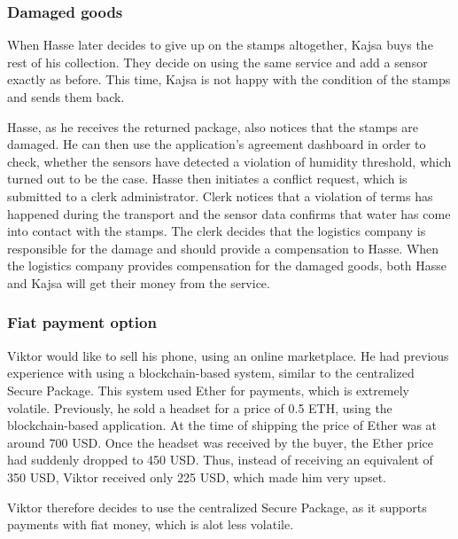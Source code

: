 \subsubsection{Damaged goods}
When Hasse later decides to give up on the stamps altogether, Kajsa buys the rest of his collection. They decide on using the same service and add a sensor exactly as before. This time, Kajsa is not happy with the condition of the stamps and sends them back.

Hasse, as he receives the returned package, also notices that the stamps are damaged. He can then use the application's agreement dashboard in order to check, whether the sensors have detected a violation of humidity threshold, which turned out to be the case. Hasse then initiates a conflict request, which is submitted to a clerk administrator. Clerk notices that a violation of terms has happened during the transport and the sensor data confirms that water has come into contact with the stamps. The clerk decides that the logistics company is responsible for the damage and should provide a compensation to Hasse. When the logistics company provides compensation for the damaged goods, both Hasse and Kajsa will get their money from the service.

\subsubsection{Fiat payment option} \label{section:fiatoption}
Viktor would like to sell his phone, using an online marketplace. He had previous experience with using a blockchain-based system, similar to the centralized Secure Package. This system used Ether for payments, which is extremely volatile. Previously, he sold a headset for a price of 0.5 ETH, using the blockchain-based application. At the time of shipping the price of Ether was at around 700 USD. Once the headset was received by the buyer, the Ether price had suddenly dropped to 450 USD. Thus, instead of receiving an equivalent of 350 USD, Viktor received only 225 USD, which made him very upset.

Viktor therefore decides to use the centralized Secure Package, as it supports payments with fiat money, which is alot less volatile.